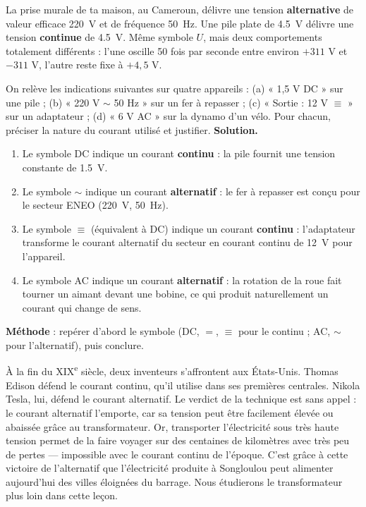 \documentclass[11pt]{article}
\newcommand{\cle}[1]{{\popxbold\color{popdark}#1}}
\begin{document}
\begin{exemplebox}
La prise murale de ta maison, au Cameroun, délivre une tension \textbf{alternative} de valeur efficace \SI{220}{V} et de fréquence \SI{50}{Hz}. Une pile plate de \SI{4,5}{V} délivre une tension \textbf{continue} de \SI{4,5}{V}. Même symbole $U$, mais deux comportements totalement différents : l'une oscille 50 fois par seconde entre environ $+311$ V et $-311$ V, l'autre reste fixe à $+4,5$ V.
\end{exemplebox}

\begin{exoresolu}
On relève les indications suivantes sur quatre appareils : (a) « 1,5 V DC » sur une pile ; (b) « 220 V $\sim$ 50 Hz » sur un fer à repasser ; (c) « Sortie : 12 V $\equiv$ » sur un adaptateur ; (d) « 6 V AC » sur la dynamo d'un vélo. Pour chacun, préciser la nature du courant utilisé et justifier.
\tcblower
\textbf{Solution.}
\begin{enumerate}
\item[(a)] Le symbole DC indique un courant \textbf{continu} : la pile fournit une tension constante de \SI{1,5}{V}.
\item[(b)] Le symbole $\sim$ indique un courant \textbf{alternatif} : le fer à repasser est conçu pour le secteur ENEO (\SI{220}{V}, \SI{50}{Hz}).
\item[(c)] Le symbole $\equiv$ (équivalent à DC) indique un courant \textbf{continu} : l'adaptateur transforme le courant alternatif du secteur en courant continu de \SI{12}{V} pour l'appareil.
\item[(d)] Le symbole AC indique un courant \textbf{alternatif} : la rotation de la roue fait tourner un aimant devant une bobine, ce qui produit naturellement un courant qui change de sens.
\end{enumerate}
\textbf{Méthode} : repérer d'abord le symbole (DC, $=$, $\equiv$ pour le continu ; AC, $\sim$ pour l'alternatif), puis conclure.
\end{exoresolu}

\begin{savaistu}
À la fin du XIX\textsuperscript{e} siècle, deux inventeurs s'affrontent aux États-Unis. Thomas \cle{Edison} défend le courant continu, qu'il utilise dans ses premières centrales. Nikola \cle{Tesla}, lui, défend le courant alternatif. Le verdict de la technique est sans appel : le courant alternatif l'emporte, car sa tension peut être facilement élevée ou abaissée grâce au \cle{transformateur}. Or, transporter l'électricité sous très haute tension permet de la faire voyager sur des centaines de kilomètres avec très peu de pertes — impossible avec le courant continu de l'époque. C'est grâce à cette victoire de l'alternatif que l'électricité produite à Songloulou peut alimenter aujourd'hui des villes éloignées du barrage. Nous étudierons le transformateur plus loin dans cette leçon.
\end{savaistu}
\end{document}
